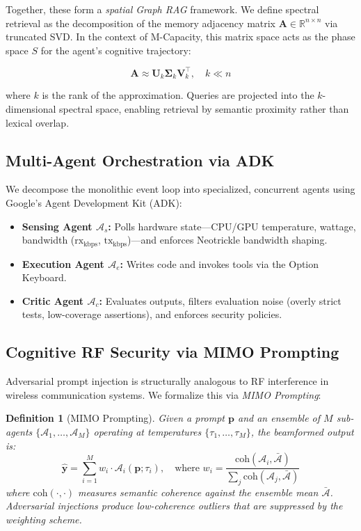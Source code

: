 \documentclass[11pt,a4paper]{article}
\newtheorem{definition}{Definition}
\begin{document}
\noindent Together, these form a \emph{spatial Graph RAG} framework. We define spectral retrieval as the decomposition of the memory adjacency matrix $\mathbf{A} \in \mathbb{R}^{n \times n}$ via truncated SVD. In the context of M-Capacity, this matrix space acts as the phase space $S$ for the agent's cognitive trajectory:

\begin{equation}
    \mathbf{A} \approx \mathbf{U}_k \boldsymbol{\Sigma}_k \mathbf{V}_k^\top, \quad k \ll n
    \label{eq:spectral}
\end{equation}

\noindent where $k$ is the rank of the approximation. Queries are projected into the $k$-dimensional spectral space, enabling retrieval by semantic proximity rather than lexical overlap.

\subsection{Multi-Agent Orchestration via ADK}

We decompose the monolithic event loop into specialized, concurrent agents using Google's Agent Development Kit (ADK):

\begin{itemize}
    \item \textbf{Sensing Agent $\mathcal{A}_s$:} Polls hardware state---CPU/GPU temperature, wattage, bandwidth ($\text{rx}_{\text{kbps}}$, $\text{tx}_{\text{kbps}}$)---and enforces Neotrickle bandwidth shaping.
    \item \textbf{Execution Agent $\mathcal{A}_e$:} Writes code and invokes tools via the Option Keyboard.
    \item \textbf{Critic Agent $\mathcal{A}_c$:} Evaluates outputs, filters evaluation noise (overly strict tests, low-coverage assertions), and enforces security policies.
\end{itemize}

\subsection{Cognitive RF Security via MIMO Prompting}

Adversarial prompt injection is structurally analogous to RF interference in wireless communication systems. We formalize this via \emph{MIMO Prompting}:

\begin{definition}[MIMO Prompting]
Given a prompt $\mathbf{p}$ and an ensemble of $M$ sub-agents $\{\mathcal{A}_1, \ldots, \mathcal{A}_M\}$ operating at temperatures $\{\tau_1, \ldots, \tau_M\}$, the beamformed output is:
\begin{equation}
    \hat{\mathbf{y}} = \sum_{i=1}^{M} w_i \cdot \mathcal{A}_i(\mathbf{p}; \tau_i), \quad \text{where } w_i = \frac{\text{coh}(\mathcal{A}_i, \bar{\mathcal{A}})}{\sum_j \text{coh}(\mathcal{A}_j, \bar{\mathcal{A}})}
    \label{eq:mimo}
\end{equation}
where $\text{coh}(\cdot, \cdot)$ measures semantic coherence against the ensemble mean $\bar{\mathcal{A}}$. Adversarial injections produce low-coherence outliers that are suppressed by the weighting scheme.
\end{definition}
\end{document}
